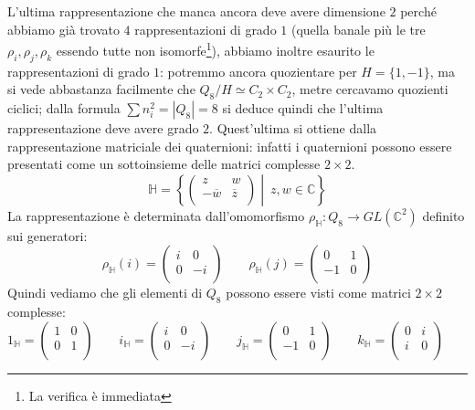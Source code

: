 \documentclass[11pt]{article}
\theoremstyle{plain}
\theoremstyle{definition}
\theoremstyle{remark}
\newcommand{\C}{\mathbb{C}}
\newcommand{\HH}{\mathbb{H}}
\DeclareMathOperator{\iso}{\simeq}
\begin{document}
L'ultima rappresentazione che manca ancora deve avere dimensione $2$ perché abbiamo già trovato $4$ rappresentazioni di grado $1$ (quella banale più le tre $\rho_i, \rho_j, \rho_k$ essendo tutte non isomorfe\footnote{La verifica è immediata}), abbiamo inoltre esaurito le rappresentazioni di grado $1$: potremmo ancora quozientare per $H=\{ 1, -1 \}$, ma si vede abbastanza facilmente che $Q_8/H\iso C_2\times C_2$, metre cercavamo quozienti ciclici; dalla formula $\sum n_i^2=|Q_8| = 8$ si deduce quindi che l'ultima rappresentazione deve avere grado $2$. Quest'ultima si ottiene dalla rappresentazione matriciale dei quaternioni: infatti i quaternioni possono essere presentati come un sottoinsieme delle matrici complesse $2\times 2$.
\[
	\HH = \left\{
		\begin{pmatrix}
	              	z & w\\
	              	-\overline{w} & \overline{z}\\
	              \end{pmatrix}
	              \middle|\ z,w\in \C
		\right\}
\]
La rappresentazione è determinata dall'omomorfismo $\rho_{\HH}:Q_8\to GL(\C^2)$ definito sui generatori:
\[
	\rho_{\HH}(i) = \begin{pmatrix}
	          	i & 0\\
	          	0 & -i\\
	          \end{pmatrix}
	\qquad
	\rho_{\HH}(j) = \begin{pmatrix}
	          	0 & 1\\
	          	-1& 0\\
	          \end{pmatrix}
\]
Quindi vediamo che gli elementi di $Q_8$ possono essere visti come matrici $2\times2$ complesse:
\[
1_\HH =
\left(
\begin{array}{cc}
1 & 0 \\
0 & 1 \\
\end{array}
\right)
\qquad
i_\HH =
\left(
\begin{array}{cc}
i & 0 \\
0 & -i \\
\end{array}
\right)
\qquad
j_\HH =
\left(
\begin{array}{cc}
0 & 1 \\
-1 & 0 \\
\end{array}
\right)
\qquad
k_\HH =
\left(
\begin{array}{cc}
0 & i \\
i & 0 \\
\end{array}
\right)
\qquad
\]
\end{document}
